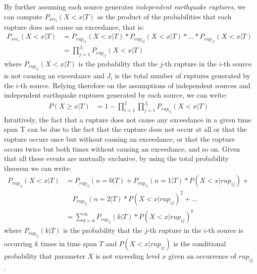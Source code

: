 By further assuming each source generates \textit{independent
earthquake ruptures}, we can compute $P_{src_{i}}(X < x | T)$ as the product of the probabilities that each rupture
does not cause an exceedance, that is:
\begin{align}
\label{eq:prup_noexceed_src}
P_{src_{i}}(X < x | T) & = P_{rup_{i1}}(X < x | T) * P_{rup_{i2}}(X < x | T) * ... * P_{rup_{iJ}}(X < x | T) \nonumber \\
			        & = \prod_{j=1}^{J_{i}} P_{rup_{ij}}(X < x | T)
\end{align}
where $P_{rup_{ij}}(X < x | T)$ is the probability that the $j$-th rupture in the $i$-th source is not causing an exceedance and $J_{i}$ is
the total number of ruptures generated by the $i$-th source. Relying therefore on the assumptions of independent sources
and independent earthquake ruptures generated by each source, we can write:
\begin{align}
\label{eq:hazard_eq_ind_srcs_rups}
P(X \ge x | T) & =  1 - \prod_{i=1}^{I} \prod_{j=1}^{J_{i}} P_{rup_{ij}}(X < x | T)
\end{align}
Intuitively, the fact that a rupture does not cause any
exceedance in a given time span T can be due to the fact that the rupture does not occur at all or that the
rupture occurs once but without causing an exceedance, or that the rupture occurs twice but both times
without causing an exceedance, and so on. Given that all these events are mutually exclusive, by using the
total probability theorem we can write:
\begin{align}
\label{eq:prup_noexceed_rup}
P_{rup_{ij}}(X < x | T) & = P_{rup_{ij}}(n = 0 | T) + P_{rup_{ij}}(n = 1 | T) * P(X < x | rup_{ij}) + \nonumber \\
                                &\quad	P_{rup_{ij}}(n = 2 | T) * P(X < x | rup_{ij})^{2}  + ... \nonumber \\
				 & = \sum_{k=0}^{\infty} P_{rup_{ij}}(k | T) * P(X < x | rup_{ij}) ^ {k} 
\end{align}
where $P_{rup_{ij}}(k | T)$ is the probability that the $j$-th rupture in the $i$-th source is occurring $k$ times in time span $T$ and
$P(X < x | rup_{ij})$ is the conditional probability that parameter $X$ is not exceeding level $x$ given an
occurrence of $rup_{ij}$.

